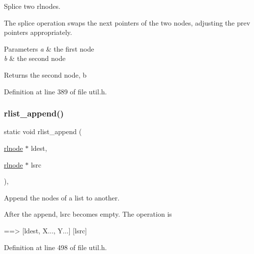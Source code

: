 Splice two rlnodes. 

The splice operation swaps the {\ttfamily next} pointers of the two nodes, adjusting the {\ttfamily prev} pointers appropriately.


\begin{DoxyParams}{Parameters}
{\em a} & the first node \\
\hline
{\em b} & the second node \\
\hline
\end{DoxyParams}
\begin{DoxyReturn}{Returns}
the second node, {\ttfamily b} 
\end{DoxyReturn}


Definition at line 389 of file util.\+h.

\mbox{\label{group__rlists_ga7f5989d7ec35645d6bbb1c15cd438532}} 
\subsubsection{\texorpdfstring{rlist\+\_\+append()}{rlist\_append()}}
{\footnotesize\ttfamily static void rlist\+\_\+append (\begin{DoxyParamCaption}\item[{\hyperlink{group__rlists_ga8f6244877f7ce2322c90525217ea6e7a}{rlnode} $\ast$}]{ldest,  }\item[{\hyperlink{group__rlists_ga8f6244877f7ce2322c90525217ea6e7a}{rlnode} $\ast$}]{lsrc }\end{DoxyParamCaption})\hspace{0.3cm}{\ttfamily [inline]}, {\ttfamily [static]}}



Append the nodes of a list to another. 

After the append, {\ttfamily lsrc} becomes empty. The operation is \begin{DoxyVerb}[ldest, X...] [lsrc, Y...]  ==> [ldest, X..., Y...]  [lsrc]
\end{DoxyVerb}
 

Definition at line 498 of file util.\+h.

\mbox{\label{group__rlists_gac02a33ca2f63b5dc5e9597a54da32cf4}} 
